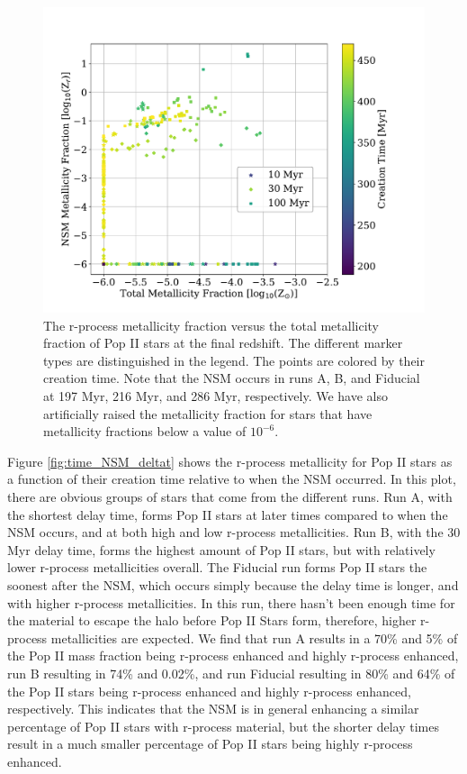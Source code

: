 \documentclass[fleqn,usenatbib]{mnras}
\begin{document}
\begin{figure} 
	\includegraphics[width=\columnwidth]{plots/time_NSM_tot.pdf}
	\caption[R-process metallicity fraction versus total metallicity fraction of Pop II stars in the delay time variation runs.]{The r-process metallicity fraction versus the total metallicity fraction of Pop II stars at the final redshift. The different marker types are distinguished in the legend. The points are colored by their creation time. Note that the NSM occurs in runs A, B, and Fiducial at 197 Myr, 216 Myr, and 286 Myr, respectively. We have also artificially raised the metallicity fraction for stars that have metallicity fractions below a value of $10^{-6}$.}
	\label{fig:time_NSM_p3}
\end{figure}

Figure \ref{fig:time_NSM_deltat} shows the r-process metallicity for Pop II stars as a function of their creation time relative to when the NSM occurred. In this plot, there are obvious groups of stars that come from the different runs. Run A, with the shortest delay time, forms Pop II stars at later times compared to when the NSM occurs, and at both high and low r-process metallicities. Run B, with the 30 Myr delay time, forms the highest amount of Pop II stars, but with relatively lower r-process metallicities overall. The Fiducial run forms Pop II stars the soonest after the NSM, which occurs simply because the delay time is longer, and with higher r-process metallicities. In this run, there hasn't been enough time for the material to escape the halo before Pop II Stars form, therefore, higher r-process metallicities are expected. We find that run A results in a 70\% and 5\% of the Pop II mass fraction being r-process enhanced and highly r-process enhanced, run B resulting in 74\% and 0.02\%, and run Fiducial resulting in 80\% and 64\% of the Pop II stars being r-process enhanced and highly r-process enhanced, respectively. This indicates that the NSM is in general enhancing a similar percentage of Pop II stars with r-process material, but the shorter delay times result in a much smaller percentage of Pop II stars being highly r-process enhanced.
\end{document}
